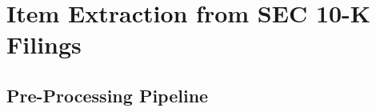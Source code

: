 \documentclass[12pt,a4paper,oneside]{report}
\begin{document}
\chapter{Item Extraction from SEC 10-K Filings}
\label{ch:item_extraction}

\section{Pre-Processing Pipeline}
\label{sec:preprocessing}
\end{document}

